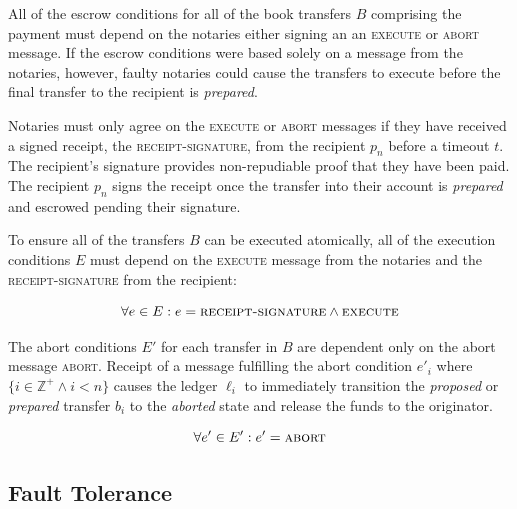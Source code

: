 \documentclass[letterpaper,twocolumn,10pt]{article}
\begin{document}
All of the escrow conditions for all of the book transfers $B$ comprising the payment must depend on the notaries either signing an an \textsc{execute} or \textsc{abort} message. If the escrow conditions were based solely on a message from the notaries, however, faulty notaries could cause the transfers to execute before the final transfer to the recipient is \textit{prepared}. \cite{dolev1983authenticated}

Notaries must only agree on the \textsc{execute} or \textsc{abort} messages if they have received a signed receipt, the \textsc{receipt-signature}, from the recipient $p_n$ before a timeout $t$. The recipient's signature provides non-repudiable proof that they have been paid. The recipient $p_n$ signs the receipt once the transfer into their account is \textit{prepared} and escrowed pending their signature.


To ensure all of the transfers $B$ can be executed atomically, all of the execution conditions $E$ must depend on the \textsc{execute} message from the notaries and the \textsc{receipt-signature} from the recipient:


\begin{equation}
\forall e \in E : e = \textsc{receipt-signature} \land \textsc{execute}
\end{equation}

The abort conditions $E'$ for each transfer in $B$ are dependent only on the abort message \textsc{abort}. Receipt of a message fulfilling the abort condition $e'_i$ where $\{ i \in \mathbb{Z}^+ \land i < n \}$ causes the ledger $\ell_i$ to immediately transition the \textit{proposed} or \textit{prepared} transfer $b_i$ to the \textit{aborted} state and release the funds to the originator.

\begin{equation}
\forall e' \in E' : e' = \textsc{abort}
\end{equation}

\subsection{Fault Tolerance}
\label{subsec:fault-tolerance}
\end{document}
